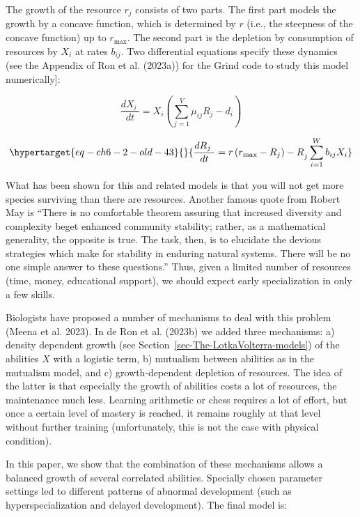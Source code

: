 \documentclass[
  a4paper,
  DIV=11,
  numbers=noendperiod,
  oneside]{scrreprt}
\begin{document}
The growth of the resource \(r_{j}\) consists of two parts. The first
part models the growth by a concave function, which is determined by
\(r\) (i.e., the steepness of the concave function) up to \(r_{\max}\).
The second part is the depletion by consumption of resources by
\(X_{i}\) at rates \(b_{ij}\). Two differential equations specify these
dynamics (see the Appendix of Ron et al. (2023a)) for the Grind code to
study this model numerically{]}:

\[\frac{dX_{i}\ }{dt} = X_{i}(\sum_{j = 1}^{V}{\mu_{ij}R_{j} - d_{i}})\]

\begin{equation}\protect\hypertarget{eq-ch6-2-old-43}{}{
\frac{dR_{j}\ }{dt} = {r\left( r_{\max} - R_{j} \right) - R}_{j}\sum_{i = 1}^{W}{b_{ij}X_{i}}
}\label{eq-ch6-2-old-43}\end{equation}

What has been shown for this and related models is that you will not get
more species surviving than there are resources. Another famous quote
from Robert May is ``There is no comfortable theorem assuring that
increased diversity and complexity beget enhanced community stability;
rather, as a mathematical generality, the opposite is true. The task,
then, is to elucidate the devious strategies which make for stability in
enduring natural systems. There will be no one simple answer to these
questions.'' Thus, given a limited number of resources (time, money,
educational support), we should expect early specialization in only a
few skills.

Biologists have proposed a number of mechanisms to deal with this
problem (Meena et al. 2023). In de Ron et al. (2023b) we added three
mechanisms: a) density dependent growth (see
Section~\ref{sec-The-LotkaVolterra-models}) of the abilities \(X\) with
a logistic term, b) mutualism between abilities as in the mutualism
model, and c) growth-dependent depletion of resources. The idea of the
latter is that especially the growth of abilities costs a lot of
resources, the maintenance much less. Learning arithmetic or chess
requires a lot of effort, but once a certain level of mastery is
reached, it remains roughly at that level without further training
(unfortunately, this is not the case with physical condition).

In this paper, we show that the combination of these mechanisms allows a
balanced growth of several correlated abilities. Specially chosen
parameter settings led to different patterns of abnormal development
(such as hyperspecialization and delayed development). The final model
is:
\end{document}
